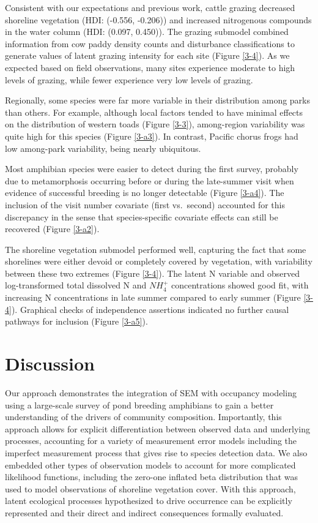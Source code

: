 Consistent with our expectations and previous work, cattle grazing
decreased shoreline vegetation (HDI: (-0.556, -0.206)) and increased
nitrogenous compounds in the water column (HDI: (0.097, 0.450)). The
grazing submodel combined information from cow paddy density counts and
disturbance classifications to generate values of latent grazing
intensity for each site (Figure \ref{3-4}). As we expected based on field
observations, many sites experience moderate to high levels of grazing,
while fewer experience very low levels of grazing.

Regionally, some species were far more variable in their distribution
among parks than others. For example, although local factors tended to
have minimal effects on the distribution of western toads (Figure \ref{3-3}),
among-region variability was quite high for this species (Figure \ref{3-a3}). In
contrast, Pacific chorus frogs had low among-park variability, being
nearly ubiquitous.

Most amphibian species were easier to detect during the first survey,
probably due to metamorphosis occurring before or during the late-summer
visit when evidence of successful breeding is no longer detectable
(Figure \ref{3-a4}). The inclusion of the visit number covariate (first
vs.~second) accounted for this discrepancy in the sense that
species-specific covariate effects can still be recovered (Figure \ref{3-a2}).

The shoreline vegetation submodel performed well, capturing the fact
that some shorelines were either devoid or completely covered by
vegetation, with variability between these two extremes (Figure \ref{3-4}). The
latent N variable and observed log-transformed total dissolved N and
$NH_4^+$ concentrations showed good fit, with increasing N
concentrations in late summer compared to early summer (Figure \ref{3-4}).
Graphical checks of independence assertions indicated no further causal
pathways for inclusion (Figure \ref{3-a5}).

\section{Discussion}

Our approach demonstrates the integration of SEM with occupancy modeling
using a large-scale survey of pond breeding amphibians to gain a better
understanding of the drivers of community composition. Importantly, this
approach allows for explicit differentiation between observed data and
underlying processes, accounting for a variety of measurement error
models including the imperfect measurement process that gives rise to
species detection data. We also embedded other types of observation
models to account for more complicated likelihood functions, including
the zero-one inflated beta distribution that was used to model
observations of shoreline vegetation cover. With this approach, latent
ecological processes hypothesized to drive occurrence can be explicitly
represented and their direct and indirect consequences formally
evaluated.

